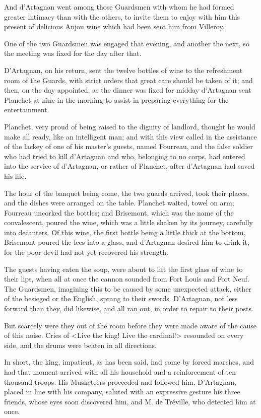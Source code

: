 And d'Artagnan went among those Guardsmen with whom he had formed greater intimacy than with the others, to invite them to enjoy with him this present of delicious Anjou wine which had been sent him from Villeroy. 

One of the two Guardsmen was engaged that evening, and another the next, so the meeting was fixed for the day after that. 

D'Artagnan, on his return, sent the twelve bottles of wine to the refreshment room of the Guards, with strict orders that great care should be taken of it; and then, on the day appointed, as the dinner was fixed for midday d'Artagnan sent Planchet at nine in the morning to assist in preparing everything for the entertainment. 

Planchet, very proud of being raised to the dignity of landlord, thought he would make all ready, like an intelligent man; and with this view called in the assistance of the lackey of one of his master's guests, named Fourreau, and the false soldier who had tried to kill d'Artagnan and who, belonging to no corps, had entered into the service of d'Artagnan, or rather of Planchet, after d'Artagnan had saved his life. 

The hour of the banquet being come, the two guards arrived, took their places, and the dishes were arranged on the table. Planchet waited, towel on arm; Fourreau uncorked the bottles; and Brisemont, which was the name of the convalescent, poured the wine, which was a little shaken by its journey, carefully into decanters. Of this wine, the first bottle being a little thick at the bottom, Brisemont poured the lees into a glass, and d'Artagnan desired him to drink it, for the poor devil had not yet recovered his strength. 

The guests having eaten the soup, were about to lift the first glass of wine to their lips, when all at once the cannon sounded from Fort Louis and Fort Neuf. The Guardsmen, imagining this to be caused by some unexpected attack, either of the besieged or the English, sprang to their swords. D'Artagnan, not less forward than they, did likewise, and all ran out, in order to repair to their posts. 

But scarcely were they out of the room before they were made aware of the cause of this noise. Cries of <Live the king! Live the cardinal!> resounded on every side, and the drums were beaten in all directions. 

In short, the king, impatient, as has been said, had come by forced marches, and had that moment arrived with all his household and a reinforcement of ten thousand troops. His Musketeers proceeded and followed him. D'Artagnan, placed in line with his company, saluted with an expressive gesture his three friends, whose eyes soon discovered him, and M. de Tréville, who detected him at once. 

